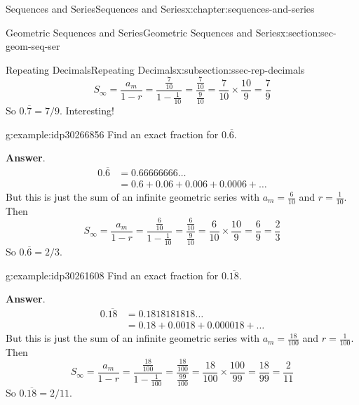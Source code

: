 \documentclass[twoside,10pt,]{book}
\newcommand{\blocktitlefont}{\relax}
\numberwithin{equation}{section}
\newcommand{\amp}{&}
\begin{document}
\begin{chapterptx}{Sequences and Series}{}{Sequences and Series}{}{}{x:chapter:sequences-and-series}
\begin{sectionptx}{Geometric Sequences and Series}{}{Geometric Sequences and Series}{}{}{x:section:sec-geom-seq-ser}
\begin{subsectionptx}{Repeating Decimals}{}{Repeating Decimals}{}{}{x:subsection:ssec-rep-decimals}
\begin{equation*}
{S_\infty } = \frac{{{a_m}}}{{1 - r}} = \frac{{\frac{7}{{10}}}}{{1 - \frac{1}{{10}}}} = \frac{{\frac{7}{{10}}}}{{\frac{9}{{10}}}} = \frac{7}{{10}} \times \frac{{10}}{9} = \frac{7}{9}
\end{equation*}
So \(0.\overline 7 = 7/9\).  Interesting! \begin{example}{}{g:example:idp30266856}%
Find an exact fraction for \(0.\overline 6 \).\par\smallskip%
\noindent\textbf{\blocktitlefont Answer}.\label{g:answer:idp30262120}{}\hypertarget{g:answer:idp30262120}{}\quad{}%
\begin{align*}
0.\overline 6  \amp = 0.66666666\ldots\\
\amp = 0.6 + 0.06 + 0.006 + 0.0006 + \ldots
\end{align*}
But this is just the sum of an infinite geometric series with \(a_m = \frac{6}{10}\) and \(r = \frac{1}{10}\).  Then%
\begin{equation*}
{S_\infty } = \frac{{{a_m}}}{{1 - r}} = \frac{{\frac{6}{{10}}}}{{1 - \frac{1}{{10}}}} = \frac{{\frac{6}{{10}}}}{{\frac{9}{{10}}}} = \frac{6}{{10}} \times \frac{{10}}{9} = \frac{6}{9} = \frac{2}{3}
\end{equation*}
So \(0.\overline 6 = 2/3\).\end{example}
 \begin{example}{}{g:example:idp30261608}%
Find an exact fraction for \(0.\overline {18}\).\par\smallskip%
\noindent\textbf{\blocktitlefont Answer}.\label{g:answer:idp30263272}{}\hypertarget{g:answer:idp30263272}{}\quad{}%
\begin{align*}
0.\overline {18}  \amp = 0.1818181818\ldots\\
\amp  = 0.18 + 0.0018 + 0.000018 + \ldots
\end{align*}
But this is just the sum of an infinite geometric series with \(a_m = \frac{18}{100}\) and \(r = \frac{1}{100}\).  Then%
\begin{equation*}
{S_\infty } = \frac{{{a_m}}}{{1 - r}} = \frac{{\frac{{18}}{{100}}}}{{1 - \frac{1}{{100}}}} = \frac{{\frac{{18}}{{100}}}}{{\frac{{99}}{{100}}}} = \frac{{18}}{{100}} \times \frac{{100}}{{99}} = \frac{{18}}{{99}} = \frac{2}{{11}}
\end{equation*}
So \(0.\overline {18} = 2/11\).\end{example}
%
\end{subsectionptx}
%
%
\typeout{************************************************}

\end{sectionptx}
\end{chapterptx}
\end{document}

